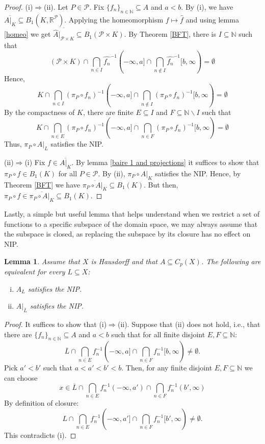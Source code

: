 \documentclass[psamsfonts]{amsart}
\newtheorem{lem}[thm]{Lemma}
\theoremstyle{definition}
\theoremstyle{remark}
\numberwithin{equation}{section}
\begin{document}
\begin{proof}
    (i)$\Rightarrow$(ii).
Let $P\in\mathcal{P}$.
Fix $\{f_n\}_{n\in\mathbb{N}}\subseteq A$ and $a<b$.
By (i), we have $\overline{A|_K}\subseteq B_1(K,\mathbb{R}^\mathcal{P})$.
Applying the homeomorphism $f\mapsto \hat{f}$ and using lemma \ref{homeo} we get $\overline{\hat{A}|_{\mathcal{P}\times K}}\subseteq B_1(\mathcal{P}\times K)$.
By Theorem \ref{BFT}, there is $I\subseteq\mathbb{N}$ such that
    $$(\mathcal{P}\times K)\cap\bigcap_{n\in I}\hat{f_n}^{-1}(-\infty,a]\cap\bigcap_{n\notin I}\hat{f_n}^{-1}[b,\infty)=\emptyset$$
    Hence,
    $$K\cap\bigcap_{n\in I}(\pi_P\circ f_n)^{-1}(-\infty,a]\cap\bigcap_{n\notin I}(\pi_P\circ f_n)^{-1}[b,\infty)=\emptyset$$
    By the compactness of $K$, there are finite $E\subseteq I$ and $F\subseteq\mathbb{N}\backslash I$ such that
    $$K\cap\bigcap_{n\in E}(\pi_P\circ f_n)^{-1}(-\infty,a]\cap\bigcap_{n\in F}(\pi_P\circ f_n)^{-1}[b,\infty)=\emptyset$$
    Thus, $\pi_P\circ A|_L$ satisfies the NIP.

    (ii)$\Rightarrow$(i) Fix $f\in\overline{A|_K}$.
By lemma \ref{baire 1 and projections} it suffices to show that $\pi_P\circ f\in B_1(K)$ for all $P\in\mathcal{P}$.
By (ii), $\pi_P\circ A|_K$ satisfies the NIP.
Hence, by Theorem \ref{BFT} we have $\overline{\pi_P\circ A|_K}\subseteq B_1(K)$.
But then, $\pi_P\circ f\in\overline{\pi_P\circ A|_K}\subseteq B_1(K)$.
\end{proof}

Lastly, a simple but useful lemma that helps understand when we restrict a set of functions to a specific subspace of the domain space, we may always assume that the subspace is closed, as replacing the subspace by its closure has no effect on NIP.

\begin{lem}\label{NIP and closure}
    Assume that $X$ is Hausdorff and that $A\subseteq C_p(X)$.
The following are equivalent for every $L\subseteq X$:
    \begin{enumerate}[(i)]
        \item
        $A_L$ satisfies the NIP.
        \item
        $A|_{\overline{L}}$ satisfies the NIP.
    \end{enumerate}
\end{lem}

\begin{proof}
    It suffices to show that (i)$\Rightarrow$(ii).
Suppose that (ii) does not hold, i.e., that there are $\{f_n\}_{n\in\mathbb{N}}\subseteq A$ and $a<b$ such that for all finite disjoint $E,F\subseteq\mathbb{N}$:
    $$\overline{L}\cap\bigcap_{n\in E}f_n^{-1}(-\infty,a]\cap\bigcap_{n\in F}f_n^{-1}[b,\infty)\neq\emptyset.$$
    Pick $a'<b'$ such that $a<a'<b'<b$.
Then, for any finite disjoint $E,F\subseteq\mathbb{N}$ we can choose
    $$x\in\overline{L}\cap\bigcap_{n\in E}f_n^{-1}(-\infty,a')\cap\bigcap_{n\in F}f_n^{-1}(b',\infty)$$
    By definition of closure:
    $$L\cap\bigcap_{n\in E}f_n^{-1}(-\infty,a']\cap\bigcap_{n\in F}f_n^{-1}[b',\infty)\neq\emptyset.$$
    This contradicts (i).
\end{proof}
\end{document}
